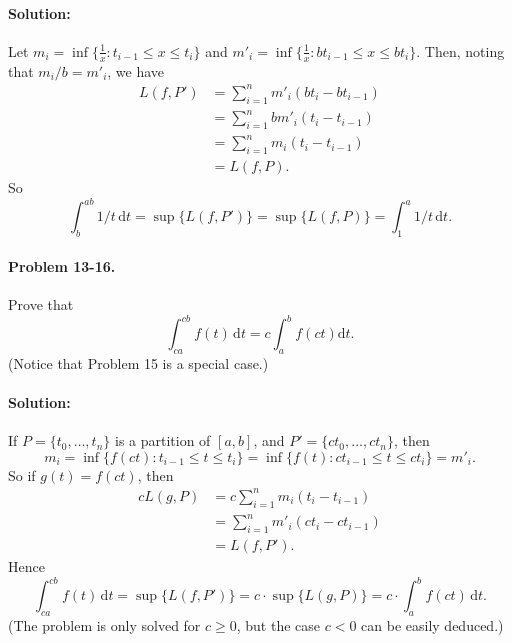 \documentclass{article}
\begin{document}
\paragraph{Solution:} Let $m_i = \inf\{\frac{1}{x}: t_{i - 1} \leq x \leq
t_i\}$ and $m'_i = \inf\{\frac{1}{x}: bt_{i - 1} \leq x \leq bt_i\}$. Then,
noting that $m_i/b = m'_i$, we have \begin{align*}
  L(f, P') &= \sum_{i = 1}^n m'_i(bt_i - bt_{i - 1}) \\
    &= \sum_{i = 1}^n bm'_i(t_i - t_{i - 1}) \\
    &= \sum_{i = 1}^n m_i(t_i - t_{i - 1}) \\
    &= L(f, P).
\end{align*} So \begin{equation*}
  \int_b^{ab} 1/t \,\mathrm{d}t = \sup\{L(f, P')\} = \sup\{L(f, P)\} = \int_1^a
    1/t \,\mathrm{d}t.
\end{equation*}

\paragraph{Problem 13-16.} Prove that \begin{equation*}
  \int_{ca}^{cb} f(t) \,\mathrm{d}t = c\int_a^b f(ct) \mathrm{d}t.
\end{equation*} (Notice that Problem 15 is a special case.)

\paragraph{Solution:} If $P = \{t_0, \ldots, t_n\}$ is a partition of $[a, b]$,
and $P' = \{ct_0, \ldots, ct_n\}$, then \begin{equation*}
  m_i = \inf\{f(ct): t_{i - 1} \leq t \leq t_i\} = \inf\{f(t): ct_{i - 1} \leq
    t \leq ct_i\} = m'_i.
\end{equation*} So if $g(t) = f(ct)$, then \begin{align*}
  cL(g, P) &= c\sum_{i = 1}^n m_i(t_i - t_{i - 1}) \\
    &= \sum_{i = 1}^n m'_i(ct_i - ct_{i - 1}) \\
    &= L(f, P').
\end{align*} Hence \begin{equation*}
  \int_{ca}^{cb} f(t) \,\mathrm{d}t = \sup\{L(f, P')\} = c \cdot \sup\{L(g,
    P)\} = c \cdot \int_a^b f(ct) \,\mathrm{d}t.
\end{equation*} (The problem is only solved for $c \geq 0$, but the case $c <
0$ can be easily deduced.)
\end{document}
